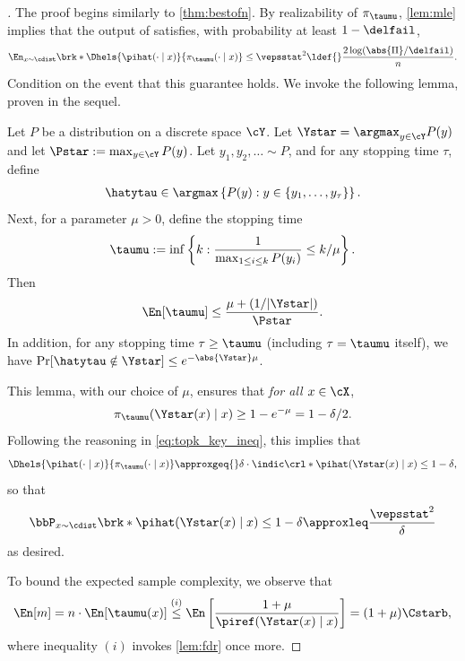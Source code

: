 \begin{proof}[]
  The proof begins similarly to \cref{thm:bestofn}. By realizability of $\pi_{\taumu}$,
\cref{lem:mle} implies that the output of \bestofnalg satisfies, with probability at least $1-\delfail$,
\begin{align}
\En_{x\sim\cdist}\brk*{\Dhels{\pihat(\cdot\mid{}x)}{\pi_{\taumu}(\cdot\mid{}x)}}\leq\vepsstat^2\ldef{}\frac{2\log(\abs{\Pi}/\delfail)}{n}.
\end{align}  
Condition on the event that this guarantee holds. We invoke
the following lemma, proven in the sequel.
\begin{lemma}\label{lem:fdr}  Let $P$ be a distribution on a discrete
  space $\cY$. Let
  $\Ystar = \argmax_{y\in\cY}P(y)$
  and let $\Pstar := \max_{y\in\cY}P(y)$. Let
  $y_1,y_2,\ldots\sim{}P$, and for any stopping time $\tau$, define
  \begin{align}
  \hatytau \in \argmax \left\{ P(y) : y \in
    \left\{y_1,\dots,y_\tau\right\}\right\}.
  \end{align}
  Next, for a parameter $\mu>0$, define the stopping time
\begin{align}
  \taumu := \inf \left\{k : \frac{1}{\max_{1 \le i \le k} P(y_i)} \le k/\mu \right\}.
\end{align}
Then
\begin{align}
  \En[\taumu] \le \frac{\mu+(1/|\Ystar|)}{\Pstar}.
\end{align}
In addition, for any stopping time $\tau \ge \taumu$ (including $\tau =
\taumu$ itself), we have $\Pr[\hatytau \notin \Ystar] \le e^{-\abs{\Ystar}\mu}$.
\end{lemma}
This lemma, with our choice of $\mu$, ensures that \emph{for all
  $x\in\cX$}, 
\begin{align}
  \pi_{\taumu}(\Ystar(x)\mid x) \ge 1 - e^{-\mu} = 1 - \delta/2.
\end{align}
Following the reasoning in \cref{eq:topk_key_ineq}, this implies that
\begin{align}
    \Dhels{\pihat(\cdot\mid{}x)}{\pi_{\taumu}(\cdot\mid{}x)}
    \approxgeq{} \delta\cdot\indic\crl*{\pihat(\Ystar(x)\mid{}x)\leq{}1-\delta}, 
\end{align}
so that
\begin{align}
      \bbP_{x\sim\cdist}\brk*{\pihat(\Ystar(x)\mid{}x)\leq{}1-\delta}\approxleq \frac{\vepsstat^2}{\delta}
\end{align}
as desired.

To bound the expected sample complexity, we observe that
\begin{align}
  \En[m] = n \cdot \En[\taumu(x)] \overset{(i)}{\le} \En\left[\frac{1 + \mu}{\piref(\Ystar(x)\mid x)}\right] = (1+\mu)\Cstarb,
\end{align}
where inequality $(i)$ invokes \cref{lem:fdr} once more.
\end{proof}


